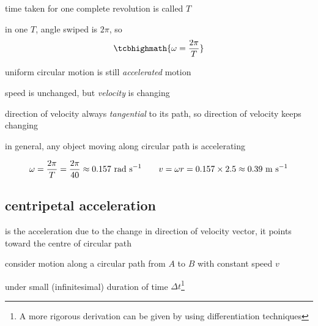 \cmt time taken for one complete revolution is called  $T$

in one $T$, angle swiped is $2\pi$, so $$\tcbhighmath{\omega=\frac{2\pi}{T}}$$

\cmt uniform circular motion is still \emph{accelerated} motion

speed is unchanged, but \emph{velocity} is changing

direction of velocity always \emph{tangential} to its path, so direction of velocity keeps changing

in general, any object moving along circular path is accelerating


\begin{soln}
    


\begin{equation*}
	\omega = \frac{2\pi}{T} = \frac{2\pi}{40} \approx 0.157 \text{ rad s$^{-1}$} \qquad v = \omega r = 0.157 \times 2.5 \approx 0.39 \text{ m s$^{-1}$} 
\end{equation*}
\end{soln}




\subsection{centripetal acceleration}

\rcyskip

\begin{ilight}
	 is the acceleration due to the change in direction of velocity vector, it points toward the centre of circular path
\end{ilight}

consider motion along a circular path from $A$ to $B$ with constant speed $v$

under small (infinitesimal) duration of time $\Delta t$\footnote{A more rigorous derivation can be given by using differentiation techniques}

